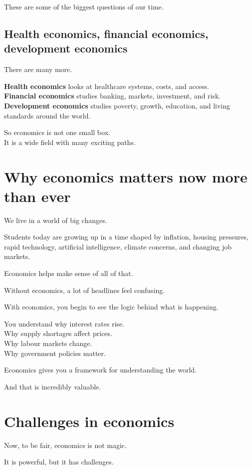 \documentclass[12pt]{article}
\begin{document}
These are some of the biggest questions of our time.

\subsection*{Health economics, financial economics, development economics}

There are many more.

\textbf{Health economics} looks at healthcare systems, costs, and access.\\
\textbf{Financial economics} studies banking, markets, investment, and risk.\\
\textbf{Development economics} studies poverty, growth, education, and living standards around the world.

So economics is not one small box.\\
It is a wide field with many exciting paths.

\section*{Why economics matters now more than ever}

We live in a world of big changes.

Students today are growing up in a time shaped by inflation, housing pressures, rapid technology, artificial intelligence, climate concerns, and changing job markets.

Economics helps make sense of all of that.

Without economics, a lot of headlines feel confusing.

With economics, you begin to see the logic behind what is happening.

You understand why interest rates rise.\\
Why supply shortages affect prices.\\
Why labour markets change.\\
Why government policies matter.

Economics gives you a framework for understanding the world.

And that is incredibly valuable.

\section*{Challenges in economics}

Now, to be fair, economics is not magic.

It is powerful, but it has challenges.
\end{document}

